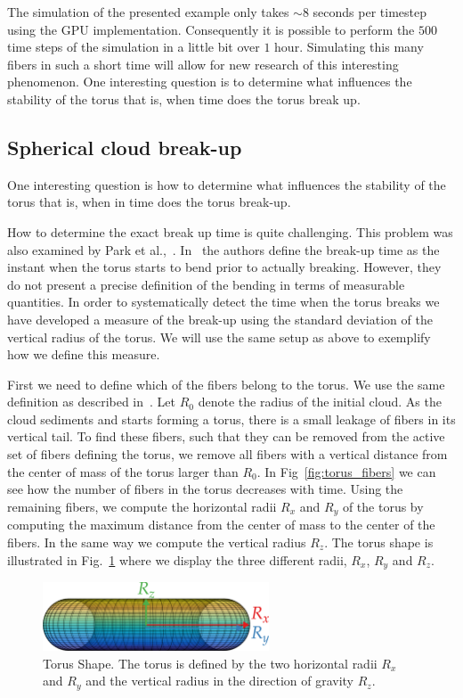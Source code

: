 The simulation of the presented example only takes ${\sim}8$ seconds per timestep using the GPU implementation. Consequently it is possible to perform the $500$ time steps of the simulation in a little bit over $1$ hour. Simulating this many fibers in such a short time will allow for new research of this interesting phenomenon. One interesting question is to determine what influences the stability of the torus that is, when time does the torus break up.

\subsection{Spherical cloud break-up}
\label{subsec:sphere_break}

One interesting question is how to determine what influences the stability of the torus that is, when in time does the torus break-up.

How to determine the exact break up time is quite challenging. This problem was also examined by Park et al.,~\cite{Park2010}. In~\cite{Park2010} the authors define the break-up time as the instant when the torus starts to bend prior to actually breaking. However, they do not present a precise definition of the bending in terms of measurable quantities. In order to systematically detect the time when the torus breaks we have developed a measure of the break-up using the standard deviation of the vertical radius of the torus.  We will use the same setup as above to exemplify how we define this measure.

First we need to define which of the fibers belong to the torus. We use the same definition as described in~\cite{Park2010}. Let $R_0$ denote the radius of the initial cloud. As the cloud sediments and starts forming a torus, there is a small leakage of fibers in its vertical tail. To find these fibers, such that they can be removed from the active set of fibers defining the torus, we remove all fibers with a vertical distance from the center of mass of the torus larger than $R_0$. In Fig~\ref{fig:torus_fibers} we can see how the number of fibers in the torus decreases with time. Using the remaining fibers, we compute the horizontal radii $R_x$ and $R_y$ of the torus by computing the maximum distance from the center of mass to the center of the fibers. In the same way we compute the vertical radius $R_z$. The torus shape is illustrated in Fig.~\ref{fig:torus_shape} where we display the three different radii, $R_x$, $R_y$ and $R_z$.

\begin{figure}[!htbp]
  \centering
  \includegraphics[width=0.6\textwidth]{img/torus3.png}
  \caption[Torus Shape.]{Torus Shape. The torus is defined by the two horizontal radii $R_x$ and $R_y$ and the vertical radius in the direction of gravity $R_z$.}
  \label{fig:torus_shape}
\end{figure}

